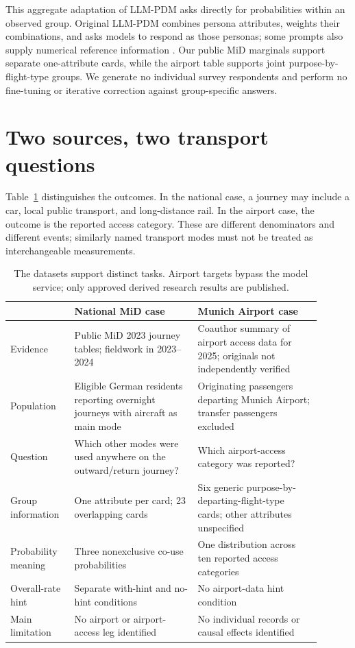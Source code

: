 \documentclass{article}
\begin{document}
This aggregate adaptation of LLM-PDM asks directly for probabilities within an observed group. Original LLM-PDM combines persona attributes, weights their combinations, and asks models to respond as those personas; some prompts also supply numerical reference information \citep{tzachristas2026}. Our public MiD marginals support separate one-attribute cards, while the airport table supports joint purpose-by-flight-type groups. We generate no individual survey respondents and perform no fine-tuning or iterative correction against group-specific answers.

\section{Two sources, two transport questions}
Table~\ref{tab:tasks} distinguishes the outcomes. In the national case, a journey may include a car, local public transport, and long-distance rail. In the airport case, the outcome is the reported access category. These are different denominators and different events; similarly named transport modes must not be treated as interchangeable measurements.

\begin{table}[htbp]
\centering\small
\begin{tabular}{>{\raggedright\arraybackslash}p{0.18\linewidth}>{\raggedright\arraybackslash}p{0.36\linewidth}>{\raggedright\arraybackslash}p{0.36\linewidth}}
\toprule
 & National MiD case & Munich Airport case\\
\midrule
Evidence & Public MiD 2023 journey tables; fieldwork in 2023--2024 & Coauthor summary of airport access data for 2025; originals not independently verified\\
Population & Eligible German residents reporting overnight journeys with aircraft as main mode & Originating passengers departing Munich Airport; transfer passengers excluded\\
Question & Which other modes were used anywhere on the outward/return journey? & Which airport-access category was reported?\\
Group information & One attribute per card; 23 overlapping cards & Six generic purpose-by-departing-flight-type cards; other attributes unspecified\\
Probability meaning & Three nonexclusive co-use probabilities & One distribution across ten reported access categories\\
Overall-rate hint & Separate with-hint and no-hint conditions & No airport-data hint condition\\
Main limitation & No airport or airport-access leg identified & No individual records or causal effects identified\\
\bottomrule
\end{tabular}
\caption{The datasets support distinct tasks. Airport targets bypass the model service; only approved derived research results are published.}
\label{tab:tasks}
\end{table}
\end{document}
